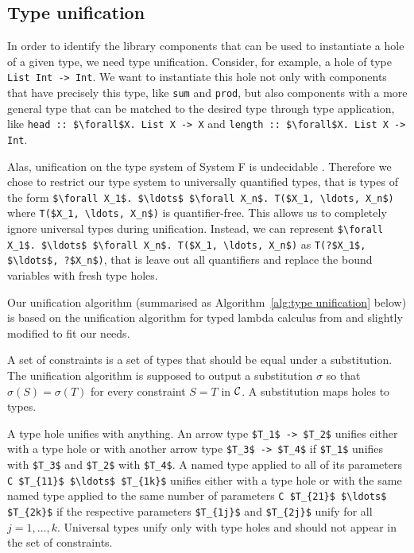 \subsection{Type unification}

In order to identify the library components that can be used to instantiate a hole of a given type, we need type unification. Consider, for example, a hole of type \lstinline?List Int -> Int?. We want to instantiate this hole not only with components that have precisely this type, like \lstinline?sum? and \lstinline?prod?, but also components with a more general type that can be matched to the desired type through type application, like \lstinline?head :: $\forall$X. List X -> X? and \lstinline?length :: $\forall$X. List X -> Int?.

Alas, unification on the type system of System F is undecidable \cite{Huet1975}.
Therefore we chose to restrict our type system to universally quantified types, that is types of the form \lstinline?$\forall X_1$. $\ldots$ $\forall X_n$. T($X_1, \ldots, X_n$)? where \lstinline?T($X_1, \ldots, X_n$)? is quantifier-free.
This allows us to completely ignore universal types during unification. Instead, we can represent \lstinline?$\forall X_1$. $\ldots$ $\forall X_n$. T($X_1, \ldots, X_n$)? as \lstinline!T(?$X_1$, $\ldots$, ?$X_n$)!, that is leave out all quantifiers and replace the bound variables with fresh type holes.

Our unification algorithm (summarised as Algorithm~\ref{alg:type unification} below) is based on the unification algorithm for typed lambda calculus from \cite{pierce2002types} and slightly modified to fit our needs.

A set of constraints is a set of types that should be equal under a substitution. The unification algorithm is supposed to output a substitution $\sigma$ so that $\sigma(S) = \sigma(T)$ for every constraint $S = T$ in $\mathcal{C}$. A substitution maps holes to types.

A type hole unifies with anything. An arrow type \lstinline?$T_1$ -> $T_2$? unifies either with a type hole or with another arrow type \lstinline?$T_3$ -> $T_4$? if \lstinline?$T_1$? unifies with \lstinline?$T_3$? and \lstinline?$T_2$? with \lstinline?$T_4$?. A named type applied to all of its parameters \lstinline?C $T_{11}$ $\ldots$ $T_{1k}$? unifies either with a type hole or with the same named type applied to the same number of parameters \lstinline?C $T_{21}$ $\ldots$ $T_{2k}$? if the respective parameters \lstinline?$T_{1j}$? and \lstinline?$T_{2j}$? unify for all $j = 1, \ldots, k$. Universal  types unify only with type holes and should not appear in the set of constraints.


